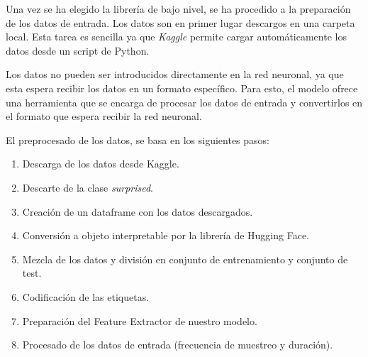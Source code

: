 Una vez se ha elegido la librería de bajo nivel, se ha procedido a la preparación de los datos de entrada.
Los datos son en primer lugar descargos en una carpeta local.
Esta tarea es sencilla ya que \textit{Kaggle} permite cargar automáticamente los datos desde un script de Python.

Los datos no pueden ser introducidos directamente en la red neuronal, ya que esta espera recibir los datos en un formato específico.
Para esto, el modelo ofrece una herramienta que se encarga de procesar los datos de entrada y convertirlos en el formato que espera recibir la red neuronal.

El preprocesado de los datos, se basa en los siguientes pasos:
\begin{enumerate}
    \item Descarga de los datos desde Kaggle.
    \item Descarte de la clase \textit{surprised}.
    \item Creación de un dataframe con los datos descargados.
    \item Conversión a objeto interpretable por la librería de Hugging Face.
    \item Mezcla de los datos y división en conjunto de entrenamiento y conjunto de test.
    \item Codificación de las etiquetas.
    \item Preparación del Feature Extractor de nuestro modelo.
    \item Procesado de los datos de entrada (frecuencia de muestreo y duración).
    
\end{enumerate}

